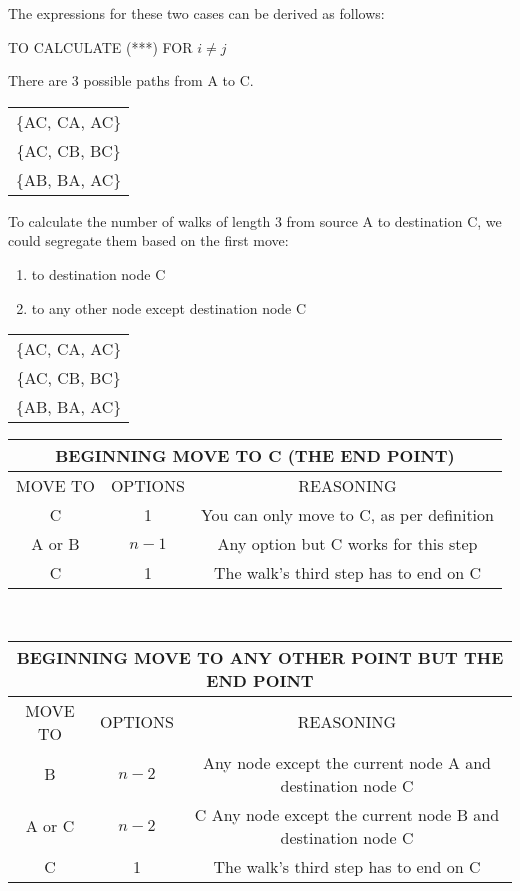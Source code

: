 \documentclass[12pt]{article}
\begin{document}
The expressions for these two cases can be derived as follows: 
\begin{center}
\Large TO CALCULATE (***) FOR $i \neq j$
\end{center}
\normalsize

There are 3 possible paths from A to C. \\
\begin{center}
\begin{tabular}{|c|}  \hline
\{AC, CA, AC\} \\
\{AC, CB, BC\} \\
\{AB, BA, AC\} \\ \hline
\end{tabular}
\end{center}

To calculate the number of walks of length 3 from source A to destination C, we could segregate them based on the first move:
\begin{enumerate}
\item to destination node C
\item to any other node except destination node C
\end{enumerate}
\begin{center}
\begin{tabular}{|c|}  \hline
\{AC, CA, AC\} \\
\{AC, CB, BC\} \\ \hline
\{AB, BA, AC\} \\ \hline
\end{tabular}


\begin{tabular}{|c|c|c|}
\multicolumn{3}{c}{BEGINNING MOVE TO C (THE END POINT)}  \\ \hline
MOVE TO & OPTIONS & REASONING \\ \hline
C & 1 & You can only move to C, as per definition \\ \hline
A or B &$n-1$ & Any option but C works for this step \\ \hline
C & 1 & The walk's third step has to end on C \\ \hline
\end{tabular} \\


\begin{tabular}{|c|c|c|}
\multicolumn{3}{c}{BEGINNING MOVE TO ANY OTHER POINT BUT THE END POINT}  \\ \hline
MOVE TO & OPTIONS & REASONING \\ \hline
B & $n-2$ & Any node except the current node A and destination node C \\ \hline
A or C & $n-2$ & C Any node except the current node B and destination node C \\ \hline
C & 1 & The walk's third step has to end on C \\ \hline
\end{tabular} \\
\end{center}
\end{document}
